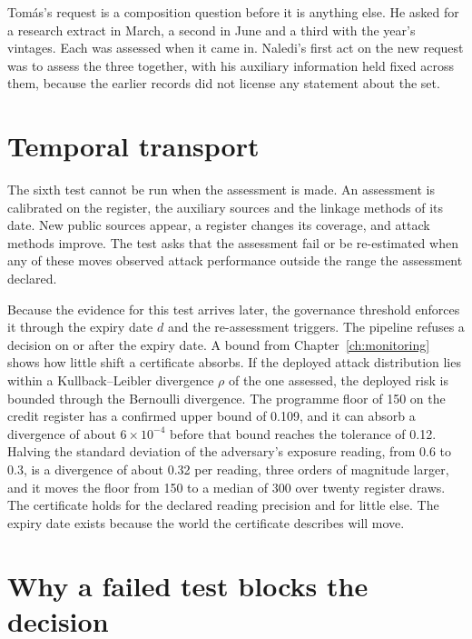 Tomás's request is a composition question before it is anything else. He asked for
a research extract in March, a second in June and a third with the year's vintages.
Each was assessed when it came in. Naledi's first act on the new request was to
assess the three together, with his auxiliary information held fixed across them,
because the earlier records did not license any statement about the set.

\section{Temporal transport}

The sixth test cannot be run when the assessment is made. An assessment is
calibrated on the register, the auxiliary sources and the linkage methods of its
date. New public sources appear, a register changes its coverage, and attack methods
improve. The test asks that the assessment fail or be re-estimated when any of these
moves observed attack performance outside the range the assessment declared.

Because the evidence for this test arrives later, the governance threshold enforces
it through the expiry date $d$ and the re-assessment triggers. The pipeline refuses
a decision on or after the expiry date. %
A bound from Chapter~\ref{ch:monitoring} shows how little shift a certificate absorbs.
If the deployed attack distribution lies within a Kullback--Leibler divergence $\rho$
of the one assessed, the deployed risk is bounded through the Bernoulli divergence.
The programme floor of 150 on the credit register has a confirmed upper bound of
0.109, and it can absorb a divergence of about $6 \times 10^{-4}$ before that bound
reaches the tolerance of 0.12. %
Halving the standard deviation of the adversary's exposure reading, from 0.6 to
0.3, is a divergence of about 0.32 per reading, three orders of magnitude larger,
and it moves the floor from 150 to a median of 300 over twenty register draws.
The certificate holds for the declared reading precision and for little else. The
expiry date exists because the world the certificate describes will move.

\section{Why a failed test blocks the decision}

